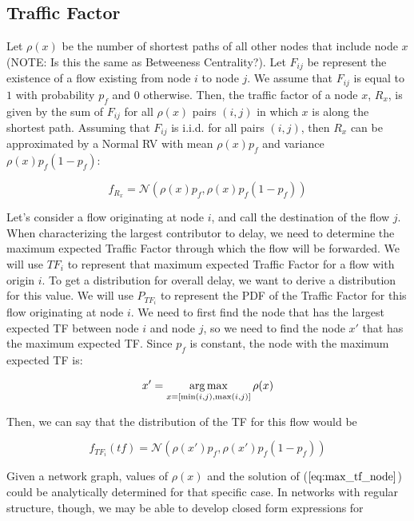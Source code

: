 \subsection{Traffic Factor}

Let $\rho(x)$ be the number of shortest paths of all other nodes that include node $x$ (NOTE: Is this the same as Betweeness Centrality?).  Let $F_{ij}$ be represent the existence of a flow existing from node $i$ to node $j$.  We assume that $F_{ij}$ is equal to $1$ with probability $p_f$ and $0$ otherwise.  Then, the traffic factor of a node $x$, $R_x$, is given by the sum of $F_{ij}$ for all $\rho(x)$ pairs $(i,j)$ in which $x$ is along the shortest path.  Assuming that $F_{ij}$ is i.i.d. for all pairs $(i,j)$, then $R_x$ can be approximated by a Normal RV with mean $\rho(x) p_f$ and variance $\rho(x) p_f (1-p_f)$:

\begin{equation}
	f_{R_x} = \mathcal{N}(\rho(x) p_f, \rho(x) p_f (1-p_f)) 
\end{equation}

Let's consider a flow originating at node $i$, and call the destination of the flow $j$.  When characterizing the largest contributor to delay, we need to determine the maximum expected Traffic Factor through which the flow will be forwarded.  We will use $TF_{i}$ to represent that maximum expected Traffic Factor for a flow with origin $i$.  To get a distribution for overall delay, we want to derive a distribution for this value.  We will use $P_{TF_i}$ to represent the PDF of the Traffic Factor for this flow originating at node $i$.  
We need to first find the node that has the largest expected TF between node $i$ and node $j$, so we need to find the node $x'$ that has the maximum expected TF.  Since $p_f$ is constant, the node with the maximum expected TF is:

\begin{equation}
\label{eq:max_tf_node}
	x' = \operatorname*{arg\,max}_{x = [\min(i,j), \max(i,j)]} \rho(x) 
\end{equation}

Then, we can say that the distribution of the TF for this flow would be

\begin{equation}
	f_{TF_{i}}(tf) = \mathcal{N}(\rho(x') p_f, \rho(x') p_f (1-p_f))
	\label{eq:pdf_TF_1}
\end{equation}

Given a network graph, values of $\rho(x)$ and the solution of ($\ref{eq:max_tf_node}$) could be analytically determined for that specific case.  In networks with regular structure, though, we may be able to develop closed form expressions for 

